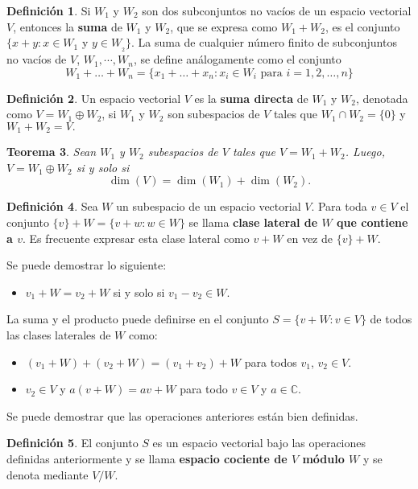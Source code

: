 \documentclass[12pt]{book}
\newtheorem{theorem}{Teorema}[section]
\theoremstyle{definition}
\newtheorem{definition}[theorem]{Definición}
\newcounter{in}
\newcounter{ini}
\begin{document}
\begin{definition}
  Si $W_{1}$ y $W_{2}$ son dos subconjuntos no vacíos de un espacio
  vectorial $V$, entonces la \textbf{suma} de $W_{1}$ y $W_{2}$, que se
  expresa como $W_{1}+W_{2}$, es el conjunto $\{x+y:x\in W_{1}$ y $y\in
  W_{_2}\}$. La suma de cualquier número finito de subconjuntos no
  vacíos de $V$, $W_{1},\cdots,W_{n}$, se define análogamente como el
  conjunto
  $$W_{1}+\ldots+W_{n}=\{x_{1}+\ldots+x_{n}: x_{i}\in W_{i} \mbox{ para }i=1,2,\ldots,n\}$$
\end{definition}

\begin{definition}
  \label{suma-directa}
  Un espacio vectorial $V$ es la \textbf{suma directa} de $W_{1}$ y
  $W_{2}$, denotada como $V=W_{1}\oplus W_{2}$, si $W_{1}$ y $W_{2}$
  son subespacios de $V$ tales que $W_{1}\cap W_{2}=\{0\}$ y
  $W_{1}+W_{2}=V.$ 
\end{definition}

\begin{theorem}
  Sean $W_{1}$ y $W_{2}$ subespacios de $V$ tales que
  $V=W_{1}+W_{2}$. Luego, $V=W_{1}\oplus W_{2}$ si y solo si 
  $$\dim(V)=\dim(W_{1})+\dim(W_{2}).$$
\end{theorem}

\begin{definition}
  Sea $W$ un subespacio de un espacio vectorial $V$. Para toda $v\in V$ el conjunto $\{v\}+W=\{v+w:w\in W\}$ se
  llama \textbf{clase lateral de $W$ que contiene a $v$}. Es frecuente
  expresar esta clase lateral como $v+W$ en vez de $\{v\}+W$. 
\end{definition}

Se puede demostrar lo siguiente:
\begin{itemize}
\item $v_{1}+W=v_{2}+W$ si y solo si $v_{1}-v_{2}\in W.$
\end{itemize}
La suma y el producto puede definirse en el conjunto $S=\{v+W:v\in
V\}$ de todos las clases laterales de $W$ como: 
\begin{itemize}
\item $(v_{1}+W)+(v_{2}+W)=(v_{1}+v_{2})+W$ para todos $v_{1}$, $v_{2}\in V$.
\item $v_{2}\in V$ y $a(v+W)=av+W$ para todo $v\in V$ y $a\in \mathbb{C}$.
\end{itemize}
Se puede demostrar que las operaciones anteriores están bien definidas.

\begin{definition}
  El conjunto $S$ es un espacio vectorial bajo las operaciones
  definidas anteriormente y se llama \textbf{espacio cociente de $V$ módulo $W$} y se denota mediante $V/W$. 
\end{definition}
\end{document}
